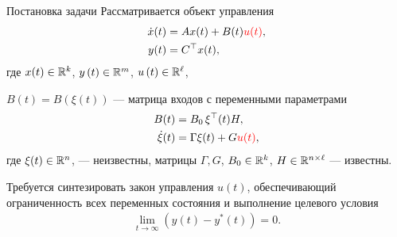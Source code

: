\begin{frame}{Постановка задачи} \hypertarget{slide\insertframenumber}{}
	Рассматривается объект управления
	\begin{align}
		\label{8}
		\dot x(t) &= Ax(t) + B(t){\color{red} u(t)},\\
		\label{9}
		y(t) &= C^\top x(t),
	\end{align}
	где  $x(t)\in\mathbb{R}^k$,  $y\left( t \right) \in \mathbb{R}^m$,  $u\left( t \right) \in\mathbb{R}^\ell $, \par 
	\vspace{4mm}
	$B(t)=B(\xi(t))$ --- матрица входов с переменными параметрами
	\begin{align}	\label{10}
		B(t) &= B_0 \,  \xi^\top (t) H,\\
		\label{11}
		\dot \xi(t) &=\Gamma \xi(t)+G{\color{red} u(t)},
	\end{align}
	где $\xi(t) \in \mathbb{R}^n$,  --- неизвестны, матрицы $ \Gamma, G$, $ B_0 \in \mathbb{R}^k$, $H\in\mathbb{R}^{n \times \ell}$ --- известны.
	
	\vspace{4mm}
	
	Требуется синтезировать закон управления $u(t)$, обеспечивающий ограниченность всех переменных состояния и выполнение целевого условия
	\begin{align}\label{12}
		\mathop {\lim }\limits_{t \to \infty } \left( {y(t)  - y^*(t)} \right) = 0.
	\end{align}
	
\end{frame}

